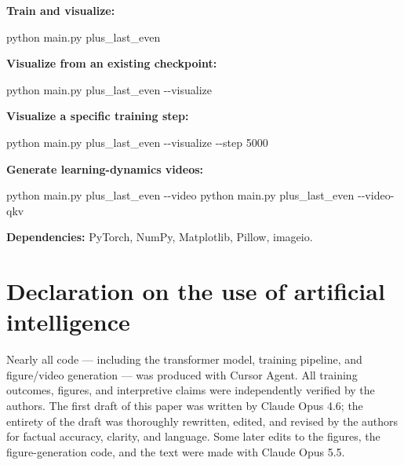 \documentclass[
  11pt,
  a4paper,
]{article}
\newenvironment{Shaded}{}{}
\newcommand{\AttributeTok}[1]{\textcolor[rgb]{0.49,0.56,0.16}{#1}}
\newcommand{\ExtensionTok}[1]{#1}
\newcommand{\NormalTok}[1]{#1}
\begin{document}
\textbf{Train and visualize:}

\begin{Shaded}
\begin{Highlighting}[]
\ExtensionTok{python}\NormalTok{ main.py plus\_last\_even}
\end{Highlighting}
\end{Shaded}

\textbf{Visualize from an existing checkpoint:}

\begin{Shaded}
\begin{Highlighting}[]
\ExtensionTok{python}\NormalTok{ main.py plus\_last\_even }\AttributeTok{{-}{-}visualize}
\end{Highlighting}
\end{Shaded}

\textbf{Visualize a specific training step:}

\begin{Shaded}
\begin{Highlighting}[]
\ExtensionTok{python}\NormalTok{ main.py plus\_last\_even }\AttributeTok{{-}{-}visualize} \AttributeTok{{-}{-}step}\NormalTok{ 5000}
\end{Highlighting}
\end{Shaded}

\textbf{Generate learning-dynamics videos:}

\begin{Shaded}
\begin{Highlighting}[]
\ExtensionTok{python}\NormalTok{ main.py plus\_last\_even }\AttributeTok{{-}{-}video}
\ExtensionTok{python}\NormalTok{ main.py plus\_last\_even }\AttributeTok{{-}{-}video{-}qkv}
\end{Highlighting}
\end{Shaded}

\textbf{Dependencies:} PyTorch, NumPy, Matplotlib, Pillow, imageio.

\section*{Declaration on the use of artificial intelligence}\label{declaration-on-the-use-of-artificial-intelligence}

Nearly all code --- including the transformer model, training pipeline,
and figure/video generation --- was produced with Cursor Agent. All
training outcomes, figures, and interpretive claims were independently
verified by the authors. The first draft of this paper was written by
Claude Opus 4.6; the entirety of the draft was thoroughly rewritten,
edited, and revised by the authors for factual accuracy, clarity, and
language. Some later edits to the figures, the figure-generation code,
and the text were made with Claude Opus 5.5.
\end{document}
